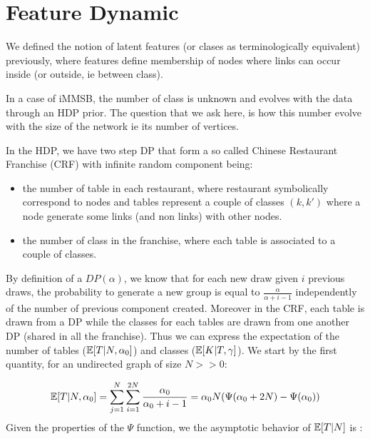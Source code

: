 \section{Feature Dynamic}

We defined the notion of latent features (or clases as terminologically equivalent) previously, where features define membership of nodes where links can occur inside (or outside, ie between class). 


In a case of iMMSB, the number of class is unknown and evolves with the data through an HDP prior. The question that we ask here, is how this number evolve with the size of the network ie its number of vertices.

In the HDP, we have two step DP that form a so called Chinese
Restaurant Franchise (CRF) with infinite random component being:
\begin{itemize}
\item the number of
table in each restaurant, where restaurant symbolically correspond to
nodes and tables represent a couple of classes $(k,k')$ where a node generate some links (and non links) with other nodes. 
\item the
number of class in the franchise, where each table is associated to a couple of classes.
\end{itemize}

By definition of a \(DP(\alpha)\), we know that for each new draw given
\(i\) previous draws, the probability to generate a new group is equal
to \(\frac{\alpha}{\alpha +i-1}\) independently of the number of previous
component created. Moreover in the CRF, each table is drawn from a DP while the classes for each tables are drawn from one another DP (shared in all the franchise). Thus we can express the expectation of the number of tables ($\mathbb{E}[T|N, \alpha_0]$) and classes ($\mathbb{E}[K|T, \gamma]$). We start by the first quantity, for an undirected graph of size $N >> 0$:

\begin{align}
\mathbb{E}[T|N, \alpha_0] = \sum_{j=1}^N\sum_{i=1}^{2N} \frac{\alpha_0}{\alpha_0 +i-1} = \alpha_0 N (\Psi(\alpha_0+2N) - \Psi(\alpha_0))
\end{align}
Given the properties of the $\Psi$ function, we the asymptotic behavior of $\mathbb{E}[T|N]$ is :

